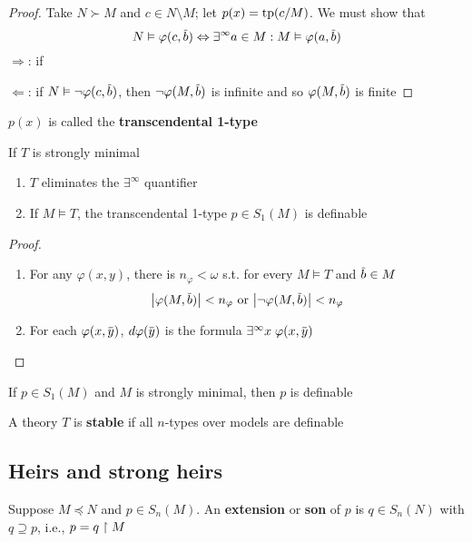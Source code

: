 \documentclass[11pt]{article}
\begin{document}
\begin{proof}
Take \(N\succ M\) and \(c\in N\setminus M\); let \(p(x)=\operatorname{tp}(c/M)\). We must show that
\begin{equation*}
N\vDash\varphi(c,\barb)\Leftrightarrow\exists^{\infty}a\in M:M\vDash\varphi(a,\barb)
\end{equation*}
\(\Rightarrow\): if

\(\Leftarrow\): if \(N\vDash\neg\varphi(c,\barb)\), then \(\neg\varphi(M,\barb)\) is infinite and so \(\varphi(M,\barb)\) is finite
\end{proof}

\(p(x)\) is called the \textbf{transcendental 1-type}

\begin{proposition}[]
If \(T\) is strongly minimal
\begin{enumerate}
\item \(T\) eliminates the \(\exists^\infty\) quantifier
\item If \(M\vDash T\), the transcendental 1-type \(p\in S_1(M)\) is definable
\end{enumerate}
\end{proposition}

\begin{proof}
\begin{enumerate}
\item For any \(\varphi(x,y)\), there is \(n_\varphi<\omega\) s.t. for every \(M\vDash T\) and \(\barb\in M\)
\begin{equation*}
\abs{\varphi(M,\barb)}<n_\varphi\text{ or }\abs{\neg\varphi(M,\barb)}<n_\varphi
\end{equation*}
\item For each \(\varphi(x,\bary)\), \(d\varphi(\bary)\) is the formula \(\exists^\infty x\;\varphi(x,\bary)\)
\end{enumerate}
\end{proof}

\begin{corollary}[]
If \(p\in S_1(M)\) and \(M\) is strongly minimal, then \(p\) is definable
\end{corollary}

\begin{definition}[]
A theory \(T\) is \textbf{stable} if all \(n\)-types over models are definable
\end{definition}
\subsection{Heirs and strong heirs}
\label{sec:orgb9a2a53}
Suppose \(M\preceq N\) and \(p\in S_n(M)\). An \textbf{extension} or \textbf{son} of \(p\) is \(q\in S_n(N)\)
with \(q\supseteq p\), i.e., \(p=q\upharpoonright M\)
\end{document}
